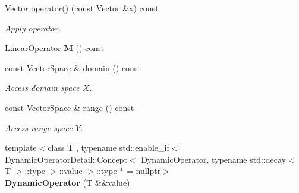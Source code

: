\begin{DoxyCompactItemize}
\item 
\hypertarget{classSpacy_1_1DynamicOperator_ace2c2202ca6eb3fe5f5817087d30510a}{\hyperlink{classSpacy_1_1Vector}{\-Vector} \hyperlink{classSpacy_1_1DynamicOperator_ace2c2202ca6eb3fe5f5817087d30510a}{operator()} (const \hyperlink{classSpacy_1_1Vector}{\-Vector} \&x) const }\label{classSpacy_1_1DynamicOperator_ace2c2202ca6eb3fe5f5817087d30510a}

\begin{DoxyCompactList}\small\item\em \-Apply operator. \end{DoxyCompactList}\item 
\hypertarget{classSpacy_1_1DynamicOperator_a38c8c5337fd79a98a7e64139d0cbed38}{\hyperlink{classSpacy_1_1LinearOperator}{\-Linear\-Operator} {\bfseries \-M} () const }\label{classSpacy_1_1DynamicOperator_a38c8c5337fd79a98a7e64139d0cbed38}

\item 
\hypertarget{classSpacy_1_1DynamicOperator_ad457cb5571c721f97530895aa26af626}{const \hyperlink{classSpacy_1_1VectorSpace}{\-Vector\-Space} \& \hyperlink{classSpacy_1_1DynamicOperator_ad457cb5571c721f97530895aa26af626}{domain} () const }\label{classSpacy_1_1DynamicOperator_ad457cb5571c721f97530895aa26af626}

\begin{DoxyCompactList}\small\item\em \-Access domain space $X$. \end{DoxyCompactList}\item 
\hypertarget{classSpacy_1_1DynamicOperator_ab760994d921fa8d9df2882f9e4cfc9c3}{const \hyperlink{classSpacy_1_1VectorSpace}{\-Vector\-Space} \& \hyperlink{classSpacy_1_1DynamicOperator_ab760994d921fa8d9df2882f9e4cfc9c3}{range} () const }\label{classSpacy_1_1DynamicOperator_ab760994d921fa8d9df2882f9e4cfc9c3}

\begin{DoxyCompactList}\small\item\em \-Access range space $Y$. \end{DoxyCompactList}\item 
\hypertarget{classSpacy_1_1DynamicOperator_a5cc35e7a7c5a9711f465a11c81fdd29a}{{\footnotesize template$<$class T , typename std\-::enable\-\_\-if$<$ Dynamic\-Operator\-Detail\-::\-Concept$<$ Dynamic\-Operator, typename std\-::decay$<$ T $>$\-::type $>$\-::value $>$\-::type $\ast$  = nullptr$>$ }\\{\bfseries \-Dynamic\-Operator} (\-T \&\&value)}\label{classSpacy_1_1DynamicOperator_a5cc35e7a7c5a9711f465a11c81fdd29a}


\end{DoxyCompactItemize}
